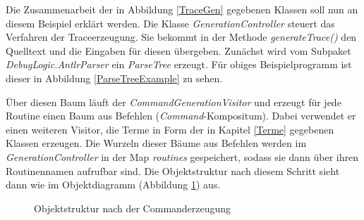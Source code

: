 \documentclass[parskip=full]{scrartcl}
\begin{document}
Die Zusammenarbeit der in Abbildung \ref{TraceGen} gegebenen Klassen soll nun an diesem Beispiel erklärt werden. 
Die Klasse \textit{GenerationController} steuert das Verfahren der Traceerzeugung. Sie bekommt in der Methode \textit{generateTrace()} den Quelltext und die Eingaben für diesen übergeben. Zunächst wird vom Subpaket \textit{DebugLogic.AntlrParser} ein \textit{ParseTree} erzeugt. Für obiges Beispielprogramm ist dieser in Abbildung \ref{ParseTreeExample} zu sehen.
\begin{center}
\label{ParseTreeExample}
\end{center}
Über diesen Baum läuft der \textit{CommandGenerationVisitor} und erzeugt für jede Routine einen Baum aus Befehlen (\textit{Command}-Kompositum). Dabei verwendet er einen weiteren Visitor, die Terme in Form der in Kapitel \ref{Terme} gegebenen Klassen erzeugen. 
Die Wurzeln dieser Bäume aus Befehlen werden im \textit{GenerationController} in der Map \textit{routines} gespeichert, sodass sie dann über ihren Routinennamen aufrufbar sind. Die Objektstruktur nach diesem Schritt sieht dann wie im Objektdiagramm (Abbildung \ref{CommandTreeExample}) aus.
\begin{figure}[!h]
\caption{Objektstruktur nach der Commanderzeugung}
\label{CommandTreeExample}
\end{figure}
\end{document}

